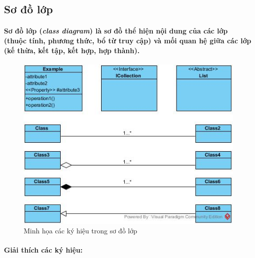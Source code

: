 \documentclass{article}
\begin{document}
  \subsection{Sơ đồ lớp}

  \paragraph{\textnormal{Sơ đồ lớp (\textit{class diagram}) là sơ đồ thể hiện nội dung của các lớp (thuộc tính, phương thức, bổ từ truy cập) và mối quan hệ giữa các lớp (kế thừa, kết tập, kết hợp, hợp thành).}}

  \begin{figure}[!ht]
    \centering
    \includegraphics[scale=0.8]{../pictures/diagrams/class/class-diagram-example.jpg}
    \caption{Minh họa các ký hiệu trong sơ đồ lớp}
  \end{figure}

  \paragraph{\textnormal{Giải thích các ký hiệu:}}
  
\end{document}
